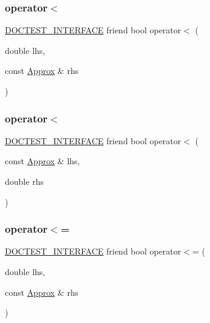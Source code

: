 \subsubsection{\texorpdfstring{operator$<$}{operator<}\hspace{0.1cm}{\footnotesize\ttfamily [1/2]}}
{\footnotesize\ttfamily \hyperlink{doctest_8h_a9c16ffc635ec47f07797d21ede26b1a5}{D\+O\+C\+T\+E\+S\+T\+\_\+\+I\+N\+T\+E\+R\+F\+A\+CE} friend bool operator$<$ (\begin{DoxyParamCaption}\item[{double}]{lhs,  }\item[{const \hyperlink{classdoctest_1_1Approx}{Approx} \&}]{rhs }\end{DoxyParamCaption})\hspace{0.3cm}{\ttfamily [friend]}}

\mbox{\label{classdoctest_1_1Approx_a54ce2536ed164b79688f43e373dcbf7b}} 
\subsubsection{\texorpdfstring{operator$<$}{operator<}\hspace{0.1cm}{\footnotesize\ttfamily [2/2]}}
{\footnotesize\ttfamily \hyperlink{doctest_8h_a9c16ffc635ec47f07797d21ede26b1a5}{D\+O\+C\+T\+E\+S\+T\+\_\+\+I\+N\+T\+E\+R\+F\+A\+CE} friend bool operator$<$ (\begin{DoxyParamCaption}\item[{const \hyperlink{classdoctest_1_1Approx}{Approx} \&}]{lhs,  }\item[{double}]{rhs }\end{DoxyParamCaption})\hspace{0.3cm}{\ttfamily [friend]}}

\mbox{\label{classdoctest_1_1Approx_af2fef67cf4508a446eeaf38dafae661f}} 
\subsubsection{\texorpdfstring{operator$<$=}{operator<=}\hspace{0.1cm}{\footnotesize\ttfamily [1/2]}}
{\footnotesize\ttfamily \hyperlink{doctest_8h_a9c16ffc635ec47f07797d21ede26b1a5}{D\+O\+C\+T\+E\+S\+T\+\_\+\+I\+N\+T\+E\+R\+F\+A\+CE} friend bool operator$<$= (\begin{DoxyParamCaption}\item[{double}]{lhs,  }\item[{const \hyperlink{classdoctest_1_1Approx}{Approx} \&}]{rhs }\end{DoxyParamCaption})\hspace{0.3cm}{\ttfamily [friend]}}

